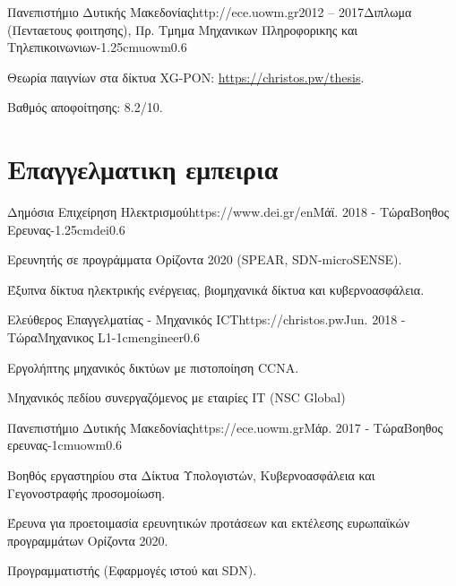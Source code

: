 \documentclass{mycv}
\begin{document}
	\begin{EntryDatedLogo}{Πανεπιστήμιο Δυτικής Μακεδονίας}{http://ece.uowm.gr}{2012 -- 2017}{Διπλωμα (Πενταετους φοιτησης), Πρ. Τμημα Μηχανικων Πληροφορικης και Τηλεπικοινωνιων}{-1.25cm}{uowm}{0.6}
		\begin{Itemize}
			\item Θεωρία παιγνίων στα δίκτυα XG-PON: \url{https://christos.pw/thesis}.
			\item Βαθμός αποφοίτησης: 8.2/10.
		\end{Itemize}
	\end{EntryDatedLogo}
	
	\section{Επαγγελματικη εμπειρια}
	\begin{EntryDatedLogo}{Δημόσια Επιχείρηση Ηλεκτρισμού}{https://www.dei.gr/en}{Μάϊ. 2018 - Τώρα}{Βοηθος Ερευνας}{-1.25cm}{dei}{0.6}
	\begin{Itemize}
		\item Ερευνητής σε προγράμματα Ορίζοντα 2020 (SPEAR, SDN-microSENSE).
		\item Έξυπνα δίκτυα ηλεκτρικής ενέργειας, βιομηχανικά δίκτυα και κυβερνοασφάλεια.
	\end{Itemize}
	\end{EntryDatedLogo}

	\vspace*{0.5cm}

	\begin{EntryDatedLogo}{Ελεύθερος Επαγγελματίας - Μηχανικός ICT}{https://christos.pw}{Jun. 2018 - Τώρα}{Μηχανικος L1}{-1cm}{engineer}{0.6}
		\begin{Itemize}
			\item Εργολήπτης μηχανικός δικτύων με πιστοποίηση CCNA.
			\item Μηχανικός πεδίου συνεργαζόμενος με εταιρίες IT (NSC Global)
		\end{Itemize}
	\end{EntryDatedLogo}

	\vspace*{0.5cm}	

	\begin{EntryDatedLogo}{Πανεπιστήμιο Δυτικής Μακεδονίας}{https://ece.uowm.gr}{Μάρ. 2017 - Τώρα}{Βοηθος ερευνας}{-1cm}{uowm}{0.6}
		\begin{Itemize}
			\item Βοηθός εργαστηρίου στα Δίκτυα Υπολογιστών, Κυβερνοασφάλεια και Γεγονοστραφής προσομοίωση.
			\item Έρευνα για προετοιμασία ερευνητικών προτάσεων και εκτέλεσης ευρωπαϊκών προγραμμάτων Ορίζοντα 2020.
			\item Προγραμματιστής (Εφαρμογές ιστού και SDN).
		\end{Itemize}
	\end{EntryDatedLogo}
	
\end{document}
